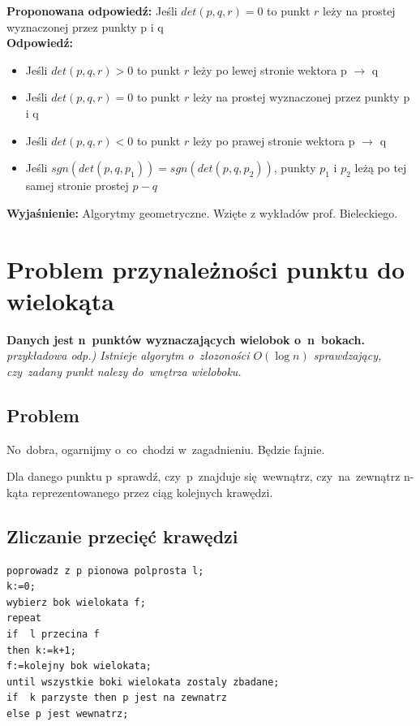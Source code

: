\vspace{0.4cm}
\noindent \textbf{Proponowana odpowiedź:} Jeśli $det(p, q, r) = 0$ to punkt $r$ leży na prostej wyznaczonej przez punkty p i q \\ 

\noindent \textbf{Odpowiedź:}
\begin{itemize}
	\item Jeśli $det(p, q, r) > 0$ to punkt $r$ leży po lewej stronie wektora p $\rightarrow$ q
	\item Jeśli $det(p, q, r) = 0$ to punkt $r$ leży na prostej wyznaczonej przez punkty p i q
	\item Jeśli $det(p, q, r) < 0$ to punkt $r$ leży po prawej stronie wektora p $\rightarrow$ q
	\item Jeśli $sgn(det(p, q, p_1)) = sgn(det(p,q, p_2))$, punkty $p_1$ i $p_2$ leżą po tej samej stronie prostej $p - q$
\end{itemize}

\noindent \textbf{Wyjaśnienie:}
Algorytmy geometryczne. Wzięte z wykładów prof. Bieleckiego.


\section{Problem przynależności punktu do wielokąta}

\textbf{Danych jest n~punktów wyznaczających wielobok o~n~bokach.}\\
\textit{przykładowa odp.) Istnieje algorytm o~złozoności $O(\log n)$ sprawdzający, czy~zadany punkt nalezy do~wnętrza wieloboku.}

\vspace{0.4cm}

\subsection{Problem}
No~dobra, ogarnijmy o~co~chodzi w~zagadnieniu. Będzie fajnie.

Dla danego punktu p~sprawdź, czy~p~znajduje się~wewnątrz, czy~na~zewnątrz n-kąta reprezentowanego przez ciąg kolejnych krawędzi.
\subsection{Zliczanie przecięć krawędzi}

\begin{lstlisting}
poprowadz z p pionowa polprosta l;
k:=0; 
wybierz bok wielokata f;
repeat
if  l przecina f
then k:=k+1;
f:=kolejny bok wielokata;
until wszystkie boki wielokata zostaly zbadane; 
if  k parzyste then p jest na zewnatrz
else p jest wewnatrz;
\end{lstlisting}

